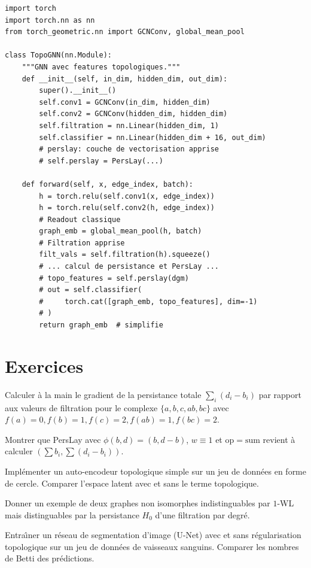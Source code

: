 \begin{verbatim}
import torch
import torch.nn as nn
from torch_geometric.nn import GCNConv, global_mean_pool

class TopoGNN(nn.Module):
    """GNN avec features topologiques."""
    def __init__(self, in_dim, hidden_dim, out_dim):
        super().__init__()
        self.conv1 = GCNConv(in_dim, hidden_dim)
        self.conv2 = GCNConv(hidden_dim, hidden_dim)
        self.filtration = nn.Linear(hidden_dim, 1)
        self.classifier = nn.Linear(hidden_dim + 16, out_dim)
        # perslay: couche de vectorisation apprise
        # self.perslay = PersLay(...)

    def forward(self, x, edge_index, batch):
        h = torch.relu(self.conv1(x, edge_index))
        h = torch.relu(self.conv2(h, edge_index))
        # Readout classique
        graph_emb = global_mean_pool(h, batch)
        # Filtration apprise
        filt_vals = self.filtration(h).squeeze()
        # ... calcul de persistance et PersLay ...
        # topo_features = self.perslay(dgm)
        # out = self.classifier(
        #     torch.cat([graph_emb, topo_features], dim=-1)
        # )
        return graph_emb  # simplifie
\end{verbatim}

\section{Exercices}

\begin{exercice}
Calculer \`a la main le gradient de la persistance totale
$\sum_i (d_i - b_i)$ par rapport aux valeurs de filtration pour
le complexe $\{a, b, c, ab, bc\}$ avec $f(a) = 0, f(b) = 1,
f(c) = 2, f(ab) = 1, f(bc) = 2$.
\end{exercice}

\begin{exercice}
Montrer que PersLay avec $\phi(b, d) = (b, d-b)$,
$w \equiv 1$ et $\mathrm{op} = \mathrm{sum}$ revient \`a
calculer $(\sum b_i, \sum(d_i - b_i))$.
\end{exercice}

\begin{exercice}
Impl\'ementer un auto-encodeur topologique simple sur un jeu de
donn\'ees en forme de cercle. Comparer l'espace latent avec et
sans le terme topologique.
\end{exercice}

\begin{exercice}
Donner un exemple de deux graphes non isomorphes indistinguables
par $1$-WL mais distinguables par la persistance $H_0$ d'une
filtration par degr\'e.
\end{exercice}

\begin{exercice}[Projet]
Entra\^\i ner un r\'eseau de segmentation d'image (U-Net) avec
et sans r\'egularisation topologique sur un jeu de donn\'ees de
vaisseaux sanguins. Comparer les nombres de Betti des
pr\'edictions.
\end{exercice}
